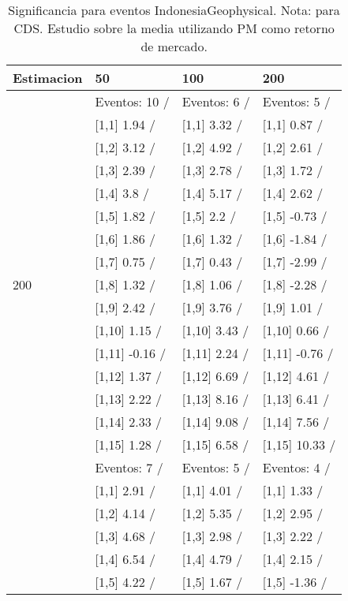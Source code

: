 \begin{table}

\caption{Significancia para eventos IndonesiaGeophysical. Nota: para CDS. Estudio sobre la media utilizando PM como retorno de mercado.}
\centering
\begin{tabular}[t]{llll}
\toprule
Estimacion & 50 & 100 & 200\\
\midrule
 & Eventos:  10 / & Eventos:  6 / & Eventos:  5 /\\
 & {}[1,1] 1.94  / & {}[1,1] 3.32  / & {}[1,1] 0.87  /\\
 & {}[1,2] 3.12  / & {}[1,2] 4.92  / & {}[1,2] 2.61  /\\
 & {}[1,3] 2.39  / & {}[1,3] 2.78  / & {}[1,3] 1.72  /\\
 & {}[1,4] 3.8  / & {}[1,4] 5.17  / & {}[1,4] 2.62  /\\
\addlinespace
 & {}[1,5] 1.82  / & {}[1,5] 2.2  / & {}[1,5] -0.73  /\\
 & {}[1,6] 1.86  / & {}[1,6] 1.32  / & {}[1,6] -1.84  /\\
 & {}[1,7] 0.75  / & {}[1,7] 0.43  / & {}[1,7] -2.99  /\\
200 & {}[1,8] 1.32  / & {}[1,8] 1.06  / & {}[1,8] -2.28  /\\
 & {}[1,9] 2.42  / & {}[1,9] 3.76  / & {}[1,9] 1.01  /\\
\addlinespace
 & {}[1,10] 1.15  / & {}[1,10] 3.43  / & {}[1,10] 0.66  /\\
 & {}[1,11] -0.16  / & {}[1,11] 2.24  / & {}[1,11] -0.76  /\\
 & {}[1,12] 1.37  / & {}[1,12] 6.69  / & {}[1,12] 4.61  /\\
 & {}[1,13] 2.22  / & {}[1,13] 8.16  / & {}[1,13] 6.41  /\\
 & {}[1,14] 2.33  / & {}[1,14] 9.08  / & {}[1,14] 7.56  /\\
\addlinespace
 & {}[1,15] 1.28  / & {}[1,15] 6.58  / & {}[1,15] 10.33  /\\
 & Eventos:  7 / & Eventos:  5 / & Eventos:  4 /\\
 & {}[1,1] 2.91  / & {}[1,1] 4.01  / & {}[1,1] 1.33  /\\
 & {}[1,2] 4.14  / & {}[1,2] 5.35  / & {}[1,2] 2.95  /\\
 & {}[1,3] 4.68  / & {}[1,3] 2.98  / & {}[1,3] 2.22  /\\
\addlinespace
 & {}[1,4] 6.54  / & {}[1,4] 4.79  / & {}[1,4] 2.15  /\\
 & {}[1,5] 4.22  / & {}[1,5] 1.67  / & {}[1,5] -1.36  /\\

\end{tabular}
\end{table}

